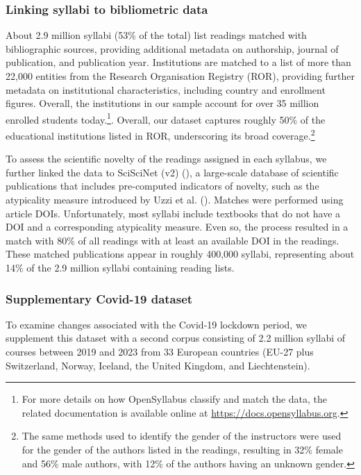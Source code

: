 \documentclass[
  british,
  12pt, %
]{article}
\begin{document}
\subsubsection{Linking syllabi to bibliometric data}\label{linking-syllabi-to-bibliometric-data}

About 2.9 million syllabi (53\% of the total) list readings matched with bibliographic sources, providing additional metadata on authorship, journal of publication, and publication year. Institutions are matched to a list of more than 22,000 entities from the Research Organisation Registry (ROR), providing further metadata on institutional characteristics, including country and enrollment figures. Overall, the institutions in our sample account for over 35 million enrolled students today.\footnote{
  For more details on how OpenSyllabus classify and match the data, the related documentation is available online at \url{https://docs.opensyllabus.org}.}. Overall, our dataset captures roughly 50\% of the educational institutions listed in ROR, underscoring its broad coverage.\footnote{
  The same methods used to identify the gender of the instructors were used for the gender of the authors listed in the readings, resulting in 32\% female and 56\% male authors, with 12\% of the authors having an unknown gender.}

To assess the scientific novelty of the readings assigned in each syllabus, we further linked the data to SciSciNet (v2) (), a large-scale database of scientific publications that includes pre-computed indicators of novelty, such as the atypicality measure introduced by Uzzi et al. (). Matches were performed using article DOIs. Unfortunately, most syllabi include textbooks that do not have a DOI and a corresponding atypicality measure. Even so, the process resulted in a match with 80\% of all readings with at least an available DOI in the readings. These matched publications appear in roughly 400,000 syllabi, representing about 14\% of the 2.9 million syllabi containing reading lists.

\subsubsection{Supplementary Covid-19 dataset}\label{supplementary-covid-19-dataset}

To examine changes associated with the Covid-19 lockdown period, we supplement this dataset with a second corpus consisting of 2.2 million syllabi of courses between 2019 and 2023 from 33 European countries (EU-27 plus Switzerland, Norway, Iceland, the United Kingdom, and Liechtenstein).
\end{document}
